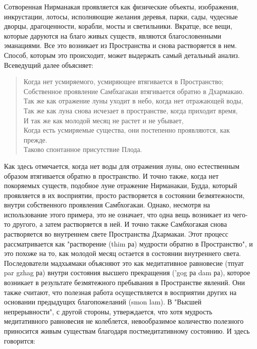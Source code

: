 Сотворенная Нирманакая проявляется как физические объекты, изображения,
инкрустации, лотосы, исполняющие желания деревья, парки, сады, чудесные дворцы,
драгоценности, корабли, мосты и светильники. Вкратце, все вещи, которые даруются на
благо живых существ, являются благословенными эманациями. Все это возникает из
Пространства и снова растворяется в нем. Способ, которым это происходит, может
выдержать самый детальный анализ. Всеведущий далее объясняет:

\begin{verse}
Когда нет усмиряемого, усмиряющее втягивается в Пространство;\\
Собственное проявление Самбхагакаи втягивается обратно в Дхармакаю.\\
Так же как отражение луны уходит в небо, когда нет отражающей воды,\\
Так же как луна снова исчезает в пространстве, когда приходит время,\\
И так же как молодой месяц не растет и не убывает,\\
Когда есть усмиряемые существа, они постепенно проявляются, как прежде.\\
Таково спонтанное присутствие Плода.
\end{verse}

Как здесь отмечается, когда нет воды для отражения луны, оно естественным образом
втягивается обратно в пространство. И точно также, когда нет покоряемых существ,
подобное луне отражение Нирманакаи, Будда, который проявляется в их восприятии, просто
растворяется в состоянии безмятежности, внутри собственного проявления Самбхогакаи.
Однако, несмотря на использование этого примера, это не означает, что одна вещь возникает
из чего-то другого, а затем растворяется в ней.
И точно также Самбхогакая снова растворяется во внутреннем свете Пространства
Дхармакаи. Этот процесс рассматривается как "растворение (thim ра) мудрости обратно в
Пространство", и это похоже на то, как молодой месяц остается в состоянии внутреннего
света. Последователи мадхьямаки объясняют это как медитативное равновесие (тпуат par
gzhag ра) внутри состояния высшего прекращения ('gog ра dam ра), которое возникает в
результате безмятежного пребывания в Пространстве явлений. Они также считают, что
полезная работа осуществляется в восприятии других на основании предыдущих
благопожеланий (smon lam). В "Высшей непрерывности", с другой стороны, утверждается,
что хотя мудрость медитативного равновесия не колеблется, невообразимое количество
полезного приносится живым существам благодаря постмедитативному состоянию. И здесь
говорится:

